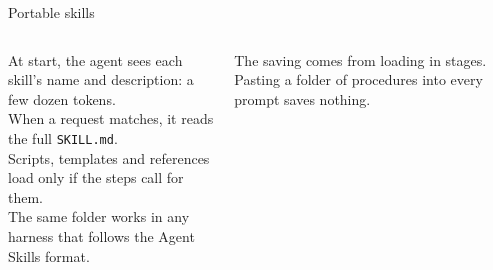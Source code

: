 \begin{frame}{Portable skills}
  \begin{columns}[T,onlytextwidth]
      {\small
      At start, the agent sees each skill's name and description: a few dozen tokens.\\[0.45em]
      When a request matches, it reads the full \texttt{SKILL.md}.\\[0.45em]
      Scripts, templates and references load only if the steps call for them.\\[0.45em]
      The same folder works in any harness that follows the Agent Skills format.\par}
      \vspace{0.4em}
      {\scriptsize\color{muted} The saving comes from loading in stages. Pasting a folder of procedures into every prompt saves nothing.\par}
  \end{columns}
\end{frame}

